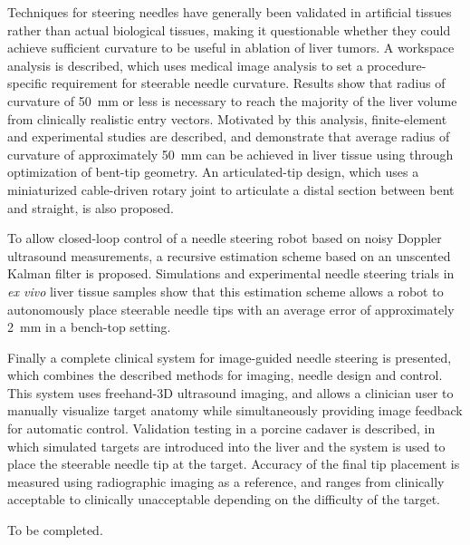 \documentclass[12pt,twoside]{report}
\begin{document}
Techniques for steering needles have generally been validated in artificial tissues rather than actual biological tissues, making it questionable whether they could achieve sufficient curvature to be useful in ablation of liver tumors. A workspace analysis is described, which uses medical image analysis to set a procedure-specific requirement for steerable needle curvature. Results show that radius of curvature of 50~mm or less is necessary to reach the majority of the liver volume from clinically realistic entry vectors. Motivated by this analysis, finite-element and experimental studies are described, and demonstrate that average radius of curvature of approximately 50~mm can be achieved in liver tissue using through optimization of bent-tip geometry. An articulated-tip design, which uses a miniaturized cable-driven rotary joint to articulate a distal section between bent and straight, is also proposed.

To allow closed-loop control of a needle steering robot based on noisy Doppler ultrasound measurements, a recursive estimation scheme based on an unscented Kalman filter is proposed. Simulations and experimental needle steering trials in \textit{ex vivo} liver tissue samples show that this estimation scheme allows a robot to autonomously place steerable needle tips with an average error of approximately 2~mm in a bench-top setting.

Finally a complete clinical system for image-guided needle steering is presented, which combines the described methods for imaging, needle design and control. This system uses freehand-3D ultrasound imaging, and allows a clinician user to manually visualize target anatomy while simultaneously providing image feedback for automatic control. Validation testing in a porcine cadaver is described, in which simulated targets are introduced into the liver and the system is used to place the steerable needle tip at the target. Accuracy of the final tip placement is measured using radiographic imaging as a reference, and ranges from clinically acceptable to clinically unacceptable depending on the difficulty of the target. 


To be completed.

\tableofcontents
\end{document}
